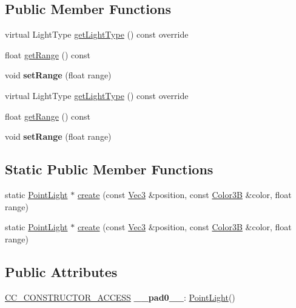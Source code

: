 \subsection*{Public Member Functions}
\begin{DoxyCompactItemize}
\item 
virtual Light\+Type \hyperlink{classPointLight_aa5747f236903390e8b2834e330b8af61}{get\+Light\+Type} () const override
\item 
float \hyperlink{classPointLight_adcbefec535c7efa734cb282e2b2161be}{get\+Range} () const
\item 
\mbox{\label{classPointLight_a875535ee5179bd5f68d73b758964c441}} 
void {\bfseries set\+Range} (float range)
\item 
virtual Light\+Type \hyperlink{classPointLight_aa5747f236903390e8b2834e330b8af61}{get\+Light\+Type} () const override
\item 
float \hyperlink{classPointLight_adcbefec535c7efa734cb282e2b2161be}{get\+Range} () const
\item 
\mbox{\label{classPointLight_a875535ee5179bd5f68d73b758964c441}} 
void {\bfseries set\+Range} (float range)
\end{DoxyCompactItemize}
\subsection*{Static Public Member Functions}
\begin{DoxyCompactItemize}
\item 
static \hyperlink{classPointLight}{Point\+Light} $\ast$ \hyperlink{classPointLight_a1443c51d9e6992baa7bcb53e393a6c30}{create} (const \hyperlink{classVec3}{Vec3} \&position, const \hyperlink{structColor3B}{Color3B} \&color, float range)
\item 
static \hyperlink{classPointLight}{Point\+Light} $\ast$ \hyperlink{classPointLight_a5b827ddee1c37ec53b1f42c43cb5ef61}{create} (const \hyperlink{classVec3}{Vec3} \&position, const \hyperlink{structColor3B}{Color3B} \&color, float range)
\end{DoxyCompactItemize}
\subsection*{Public Attributes}
\begin{DoxyCompactItemize}
\item 
\mbox{\label{classPointLight_a9bf79ff8b740bf7ae845c22370aee87b}} 
\hyperlink{_2cocos2d_2cocos_2base_2ccConfig_8h_a25ef1314f97c35a2ed3d029b0ead6da0}{C\+C\+\_\+\+C\+O\+N\+S\+T\+R\+U\+C\+T\+O\+R\+\_\+\+A\+C\+C\+E\+SS} {\bfseries \+\_\+\+\_\+pad0\+\_\+\+\_\+}\+: \hyperlink{classPointLight}{Point\+Light}()
\end{DoxyCompactItemize}
